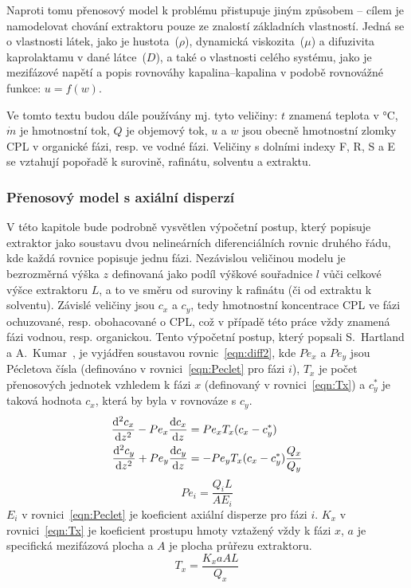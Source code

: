 Naproti tomu přenosový model k problému přistupuje jiným způsobem -- cílem je namodelovat chování extraktoru pouze ze znalostí základních vlastností.
Jedná se o vlastnosti látek, jako je hustota~($\rho$), dynamická viskozita~($\mu$) a difuzivita kaprolaktamu v dané látce~($D$), a také o vlastnosti celého systému, jako je mezifázové napětí a popis rovnováhy kapalina--kapalina v podobě rovnovážné funkce: $u=f(w)$.

Ve tomto textu budou dále používány mj. tyto veličiny: $t$ znamená teplota v °C, $\dot{m}$ je hmotnostní tok, $Q$ je objemový tok, $u$ a $w$ jsou obecně hmotnostní zlomky CPL v organické fázi, resp. ve vodné fázi.
Veličiny s dolními indexy F, R, S a E se vztahují popořadě k surovině, rafinátu, solventu a extraktu.

\subsubsection{Přenosový model s axiální disperzí} \label{diff2}
V této kapitole bude podrobně vysvětlen výpočetní postup, který popisuje extraktor jako soustavu dvou nelineárních diferenciálních rovnic druhého řádu, kde každá rovnice popisuje jednu fázi.
Nezávislou veličinou modelu je bezrozměrná výška $z$ definovaná jako podíl výškové souřadnice $l$ vůči celkové výšce extraktoru $L$, a to ve směru od suroviny k rafinátu (či od extraktu k solventu).
Závislé veličiny jsou $c_x$ a $c_y$, tedy hmotnostní koncentrace CPL ve fázi ochuzované, resp. obohacované o CPL, což v případě této práce vždy znamená fázi vodnou, resp. organickou.
Tento výpočetní postup, který popsali S.~Hartland a A.~Kumar~\cite{HartlandKumar1997}, je vyjádřen soustavou rovnic~\ref{eqn:diff2}, kde $Pe_x$ a $Pe_y$ jsou Pécletova čísla (definováno v rovnici~\ref{eqn:Peclet} pro fázi $i$), $T_x$ je počet přenosových jednotek vzhledem k fázi $x$ (definovaný v rovnici~\ref{eqn:Tx}) a $c_y^*$ je taková hodnota $c_x$, která by byla v rovnováze s $c_y$.
\begin{align}
\label{eqn:diff2}
	\frac{\mathrm{d}^2 c_x}{\mathrm{d} z^2} - Pe_x \frac{\mathrm{d} c_x}{\mathrm{d} z} &=  Pe_x T_x (c_x - c_y^*) \\
	\frac{\mathrm{d}^2 c_y}{\mathrm{d} z^2} + Pe_y \frac{\mathrm{d} c_y}{\mathrm{d} z} &= -Pe_y T_x (c_x - c_y^*) \frac{Q_x}{Q_y} \nonumber
\end{align}
\begin{equation}
\label{eqn:Peclet}
	Pe_i = \frac{Q_i L}{A E_i}
\end{equation}
$E_i$ v rovnici~\ref{eqn:Peclet} je koeficient axiální disperze pro fázi $i$.
$K_x$ v rovnici~\ref{eqn:Tx} je koeficient prostupu hmoty vztažený vždy k fázi $x$, $a$ je specifická mezifázová plocha a $A$ je plocha průřezu extraktoru.
\begin{equation}
\label{eqn:Tx}
	T_x = \frac{K_x a A L}{Q_x}
\end{equation}

